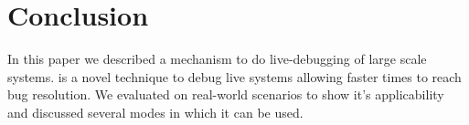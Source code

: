 \section{Conclusion}
\label{sec:conclusion}

In this paper we described \parikshan a mechanism to do live-debugging of large scale systems.
\parikshan is a novel technique to debug live systems allowing faster times to reach bug resolution.
We evaluated \parikshan on real-world scenarios to show it's applicability and discussed several modes in which it can be used.

